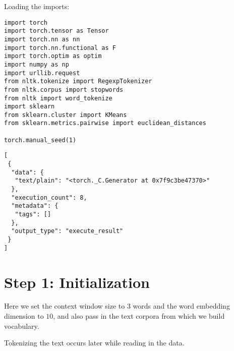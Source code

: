 \documentclass[
]{article}
\begin{document}
Loading the imports:

\begin{verbatim}
import torch
import torch.tensor as Tensor
import torch.nn as nn
import torch.nn.functional as F
import torch.optim as optim
import numpy as np
import urllib.request
from nltk.tokenize import RegexpTokenizer
from nltk.corpus import stopwords
from nltk import word_tokenize
import sklearn
from sklearn.cluster import KMeans
from sklearn.metrics.pairwise import euclidean_distances

torch.manual_seed(1)
\end{verbatim}

\begin{verbatim}
[
 {
  "data": {
   "text/plain": "<torch._C.Generator at 0x7f9c3be47370>"
  },
  "execution_count": 8,
  "metadata": {
   "tags": []
  },
  "output_type": "execute_result"
 }
]
\end{verbatim}

\hypertarget{step-1-initialization}{%
\section{Step 1: Initialization}\label{step-1-initialization}}

Here we set the context window size to \(3\) words and the word
embedding dimension to \(10\), and also pass in the text corpora from
which we build vocabulary.

Tokenizing the text occurs later while reading in the data.
\end{document}
